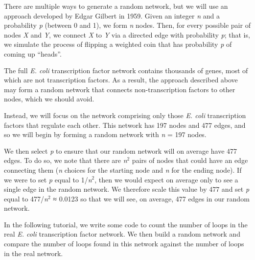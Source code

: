 There are multiple ways to generate a random network, but we will use an approach developed by Edgar Gilbert in 1959. Given an integer \textit{n} and a probability \textit{p} (between 0 and 1), we form \textit{n} nodes. Then, for every possible pair of nodes \textit{X} and \textit{Y}, we connect \textit{X} to \textit{Y} via a directed edge with probability \textit{p}; that is, we simulate the process of flipping a weighted coin that has probability \textit{p} of coming up ``heads''.

\begin{note}\end{note}

\begin{qbox}\end{qbox} 

The full \textit{E. coli} transcription factor network contains thousands of genes, most of which are not transcription factors. As a result, the approach described above may form a random network that connects non-transcription factors to other nodes, which we should avoid.

Instead, we will focus on the network comprising only those \textit{E. coli} transcription factors that regulate each other. This network has 197 nodes and 477 edges, and so we will begin by forming a random network with \textit{n} = 197 nodes.

We then select \textit{p} to ensure that our random network will on average have 477 edges. To do so, we note that there are \textit{n}$^2$ pairs of nodes that could have an edge connecting them (\textit{n} choices for the starting node and \textit{n} for the ending node). If we were to set \textit{p} equal to 1/\textit{n}$^2$, then we would expect on average only to see a single edge in the random network. We therefore scale this value by 477 and set \textit{p} equal to 477/\textit{n}$^2$ ≈ 0.0123 so that we will see, on average, 477 edges in our random network.

In the following tutorial, we write some code to count the number of loops in the real \textit{E. coli} transcription factor network. We then build a random network and compare the number of loops found in this network against the number of loops in the real network.

